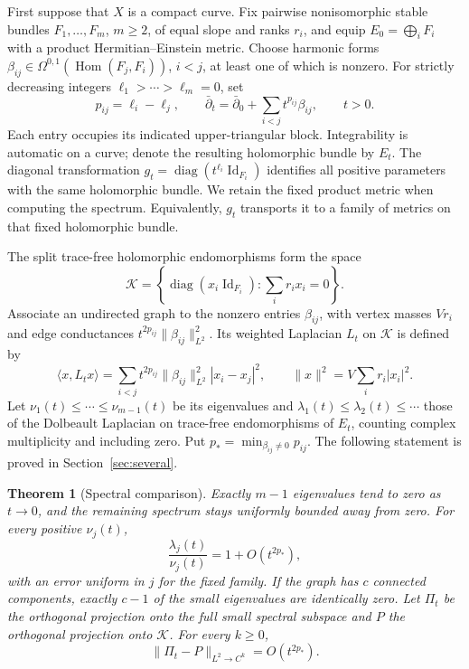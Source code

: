 \documentclass[11pt]{amsart}
\newtheorem{theorem}{Theorem}[section]
\theoremstyle{definition}
\theoremstyle{remark}
\newcommand{\id}{\operatorname{Id}}
\newcommand{\db}{\bar\partial}
\newcommand{\Hom}{\operatorname{Hom}}
\newcommand{\diag}{\operatorname{diag}}
\begin{document}
First suppose that $X$ is a compact curve. Fix pairwise nonisomorphic
stable bundles $F_1,\ldots,F_m$, $m\ge2$, of equal slope and ranks $r_i$,
and equip $E_0=\bigoplus_iF_i$ with a product Hermitian--Einstein metric.
Choose harmonic forms
$\beta_{ij}\in\Omega^{0,1}(\Hom(F_j,F_i))$, $i<j$, at least one of
which is nonzero. For strictly decreasing integers
$\ell_1>\cdots>\ell_m=0$, set
\[
 p_{ij}=\ell_i-\ell_j,\qquad
 \db_t=\db_0+\sum_{i<j}t^{p_{ij}}\beta_{ij},\qquad t>0.
\]
Each entry occupies its indicated upper-triangular block. Integrability
is automatic on a curve; denote the resulting holomorphic bundle by
$E_t$. The diagonal transformation
$g_t=\diag(t^{\ell_i}\id_{F_i})$ identifies all positive parameters with
the same holomorphic bundle. We retain the fixed product metric when
computing the spectrum. Equivalently, $g_t$ transports it to a family
of metrics on that fixed holomorphic bundle.

The split trace-free holomorphic endomorphisms form the space
\[
 \mathcal K=\left\{\diag(x_i\id_{F_i}):\sum_i r_ix_i=0\right\}.
\]
Associate an undirected graph to the nonzero entries $\beta_{ij}$, with
vertex masses $Vr_i$ and edge conductances
$t^{2p_{ij}}\lVert\beta_{ij}\rVert_{L^2}^2$. Its weighted Laplacian
$L_t$ on $\mathcal K$ is defined by
\[
 \langle x,L_tx\rangle
 =\sum_{i<j}t^{2p_{ij}}\lVert\beta_{ij}\rVert_{L^2}^2|x_i-x_j|^2,
 \qquad \lVert x\rVert^2=V\sum_i r_i|x_i|^2.
\]
Let $\nu_1(t)\le\cdots\le\nu_{m-1}(t)$ be its eigenvalues and
$\lambda_1(t)\le\lambda_2(t)\le\cdots$ those of the Dolbeault Laplacian
on trace-free endomorphisms of $E_t$, counting complex multiplicity and including
zero. Put $p_* =\min_{\beta_{ij}\ne0}p_{ij}$. The following statement
is proved in Section~\ref{sec:several}.

\begin{theorem}[Spectral comparison]\label{thm:intro-spectral}
Exactly $m-1$ eigenvalues tend to zero as $t\to0$, and the remaining
spectrum stays uniformly bounded away from zero. For every positive
$\nu_j(t)$,
\[
 \frac{\lambda_j(t)}{\nu_j(t)}=1+O(t^{2p_*}),
\]
with an error uniform in $j$ for the fixed family. If the graph has $c$
connected components, exactly $c-1$ of the small eigenvalues are
identically zero. Let $\Pi_t$ be the orthogonal projection onto the full
small spectral subspace and $P$ the orthogonal projection onto
$\mathcal K$. For every $k\ge0$,
\[
 \lVert\Pi_t-P\rVert_{L^2\to C^k}=O(t^{2p_*}).
\]
\end{theorem}
\end{document}
